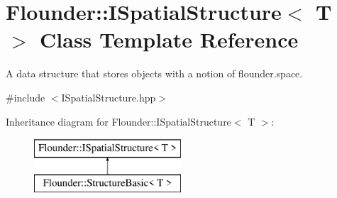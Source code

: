 \hypertarget{class_flounder_1_1_i_spatial_structure}{}\section{Flounder\+:\+:I\+Spatial\+Structure$<$ T $>$ Class Template Reference}
\label{class_flounder_1_1_i_spatial_structure}


A data structure that stores objects with a notion of flounder.\+space.  




{\ttfamily \#include $<$I\+Spatial\+Structure.\+hpp$>$}

Inheritance diagram for Flounder\+:\+:I\+Spatial\+Structure$<$ T $>$\+:\begin{figure}[H]
\begin{center}
\leavevmode
\includegraphics[height=2.000000cm]{class_flounder_1_1_i_spatial_structure}
\end{center}
\end{figure}
